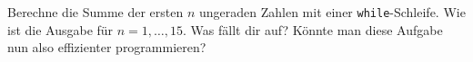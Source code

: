 \begin{aufg}
Berechne die Summe der ersten $n$ ungeraden Zahlen mit einer \texttt{while}-Schleife. Wie ist die Ausgabe für $n = 1, \ldots ,15$. Was fällt dir auf? Könnte man diese Aufgabe nun also effizienter programmieren?
\end{aufg}
